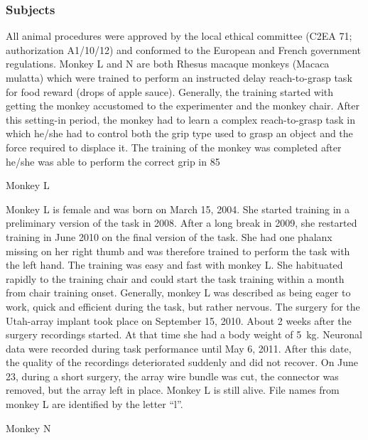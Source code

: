 {\subsubsection{Subjects}

All animal procedures were approved by the local ethical committee (C2EA 71; authorization A1/10/12) and conformed to the European and French government regulations. Monkey L and N are both Rhesus macaque monkeys (Macaca mulatta) which were trained to perform an instructed delay reach-to-grasp task for food reward (drops of apple sauce). Generally, the training started with getting the monkey accustomed to the experimenter and the monkey chair. After this setting-in period, the monkey had to learn a complex reach-to-grasp task in which he/she had to control both the grip type used to grasp an object and the force required to displace it. The training of the monkey was completed after he/she was able to perform the correct grip in 85%

Monkey L 

Monkey L is female and was born on March 15, 2004. She started training in a preliminary version of the task in 2008. After a long break in 2009, she restarted training in June 2010 on the final version of the task. She had one phalanx missing on her right thumb and was therefore trained to perform the task with the left hand. The training was easy and fast with monkey L. She habituated rapidly to the training chair and could start the task training within a month from chair training onset. Generally, monkey L was described as being eager to work, quick and efficient during the task, but rather nervous. The surgery for the Utah-array implant took place on September 15, 2010. About 2 weeks after the surgery recordings started. At that time she had a body weight of 5 kg. Neuronal data were recorded during task performance until May 6, 2011. After this date, the quality of the recordings deteriorated suddenly and did not recover. On June 23, during a short surgery, the array wire bundle was cut, the connector was removed, but the array left in place. Monkey L is still alive. File names from monkey L are identified by the letter “l”.

Monkey N 

}
